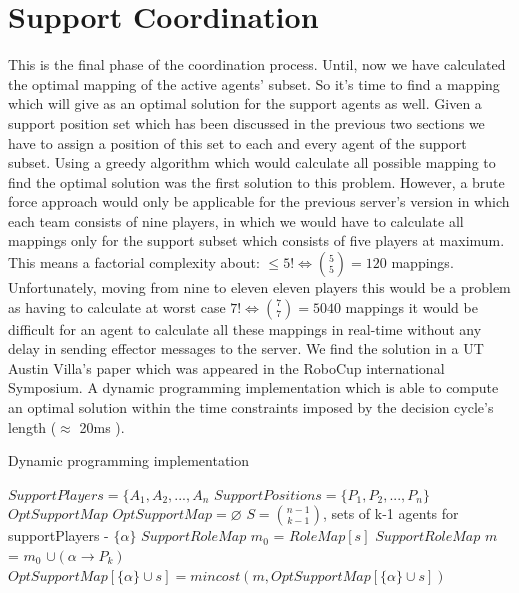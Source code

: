 \section{Support Coordination}
This is the final phase of the coordination process. Until, now we have calculated the optimal mapping of the active agents' subset. So it's time to find a mapping which will give as an optimal solution for the support agents as well. Given a support position set which has been discussed in the previous two sections we have to assign a position of this set to each and every agent of the support subset. Using a greedy algorithm which would calculate all possible mapping to find the optimal solution was the first solution to this problem. However, a brute force approach would only be applicable for the previous server's version in which each team consists of nine players, in which we would have to calculate all mappings only for the support subset which consists of five players at maximum. This means a factorial complexity about: $\leqslant 5! \Leftrightarrow  {{5}\choose{5}} = 120$ mappings. Unfortunately, moving from nine to eleven eleven players this would be a problem as having to calculate at worst case $ 7! \Leftrightarrow  {{7}\choose{7}} = 5040$ mappings it would be difficult for an agent to calculate all these mappings in real-time without any delay in sending effector messages to the server. We find the solution in a UT Austin Villa's paper \cite{UtAustinVillaPaper} which was appeared in the RoboCup international Symposium. A dynamic programming implementation which is able to compute an optimal solution within the time constraints imposed by the decision cycle's length ($\approx$ 20ms ).
\begin{algorithm}[htb!]
\caption{Dynamic programming implementation \cite{UtAustinVillaPaper}}
\label{alg3}
\begin{algorithmic}[1]
$SupportPlayers = \lbrace A_{1},A_{2},...,A_{n} $
\STATE $SupportPositions = \lbrace P_{1},P_{2},...,P_{n} \rbrace $
$OptSupportMap$
\STATE $OptSupportMap = \varnothing $
\STATE $ S = {{n-1}\choose{k-1}} $, sets of k-1 agents for supportPlayers - $\lbrace \alpha \rbrace$
\STATE $SupportRoleMap$ $m_{0}$ = $RoleMap[s]$
\STATE $SupportRoleMap$ $m$ = $m_{0}$ $ \cup (\alpha \rightarrow P_{k})$
\STATE $OptSupportMap[\lbrace \alpha \rbrace \cup s] = mincost(m,OptSupportMap[\lbrace \alpha \rbrace \cup s])$
\ENDFOR
\ENDFOR
\ENDFOR
\end{algorithmic}
\end{algorithm}

